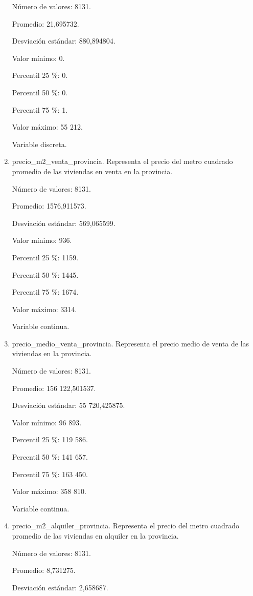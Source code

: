 \begin{enumerate}
	Número de valores: 8131.
	
	Promedio: 21,695732.
	
	Desviación estándar: 880,894804.
	
	Valor mínimo: 0.
	
	Percentil 25 \%: 0.
	
	Percentil 50 \%: 0.
	
	Percentil 75 \%: 1.
	
	Valor máximo: 55 212.
	
	Variable discreta.

	\item precio\_m2\_venta\_provincia. Representa el precio del metro cuadrado promedio de las viviendas en venta en la provincia.
	
	Número de valores: 8131.
	
	Promedio: 1576,911573.
	
	Desviación estándar: 569,065599.
	
	Valor mínimo: 936.
	
	Percentil 25 \%: 1159.
	
	Percentil 50 \%: 1445.
	
	Percentil 75 \%: 1674.
	
	Valor máximo: 3314.
	
	Variable continua.

	\item precio\_medio\_venta\_provincia. Representa el precio medio de venta de las viviendas en la provincia.
	
	Número de valores: 8131.
	
	Promedio: 156 122,501537.
	
	Desviación estándar: 55 720,425875.
	
	Valor mínimo: 96 893.
	
	Percentil 25 \%: 119 586.
	
	Percentil 50 \%: 141 657.
	
	Percentil 75 \%: 163 450.
	
	Valor máximo: 358 810.
	
	Variable continua.

	\item precio\_m2\_alquiler\_provincia. Representa el precio del metro cuadrado promedio de las viviendas en alquiler en la provincia.
	
	Número de valores: 8131.
	
	Promedio: 8,731275.
	
	Desviación estándar: 2,658687.
	

\end{enumerate}
